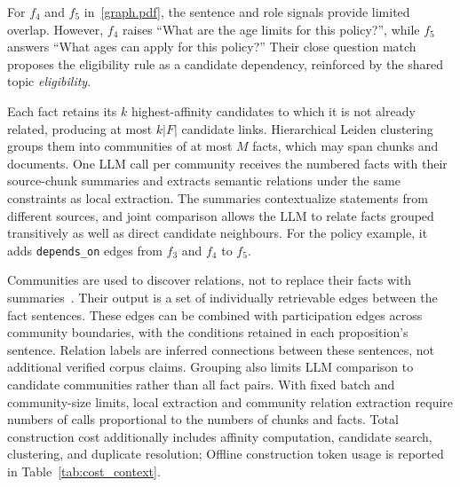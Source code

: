 \documentclass[sigconf, review, anonymous]{acmart}
\newcommand{\sys}{UNH}
\begin{document}
For $f_4$ and $f_5$ in~\autoref{graph.pdf}, the sentence and
role signals provide limited overlap. However, $f_4$ raises
``What are the age limits for this policy?'', while $f_5$
answers ``What ages can apply for this policy?'' Their close
question match proposes the eligibility rule as a candidate dependency,
reinforced by the shared topic \emph{eligibility}.

Each fact retains its $k$ highest-affinity candidates to which it is not
already related, producing at most $k|F|$ candidate links. Hierarchical
Leiden clustering groups them into communities of at most $M$ facts, which
may span chunks and documents. One LLM call per community receives the
numbered facts with their source-chunk summaries and extracts semantic
relations under the same constraints as local extraction. The summaries
contextualize statements from different sources, and joint comparison allows
the LLM to relate facts grouped transitively as well as direct candidate
neighbours. For the policy example, it adds \texttt{depends\_on} edges from
$f_3$ and $f_4$ to $f_5$.

Communities are used to discover relations, not to replace their facts with
summaries~\cite{edge2024local,zhong2026hygrag}. Their output is a set of
individually retrievable edges between the fact sentences. These edges can be
combined with participation edges across community boundaries, with the
conditions retained in each proposition's sentence. Relation labels are inferred
connections between these sentences, not additional verified corpus claims. Grouping also
limits LLM comparison to candidate communities rather than all fact pairs.
With fixed batch and community-size limits, local extraction and community
relation extraction require numbers of calls proportional to the numbers of
chunks and facts. Total construction cost additionally includes affinity
computation, candidate search, clustering, and duplicate resolution; Offline construction token usage is reported in
Table~\ref{tab:cost_context}.



\end{document}
